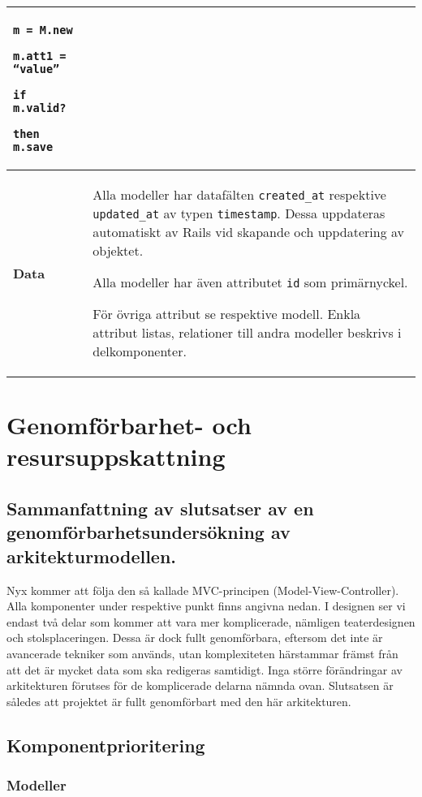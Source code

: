 \documentclass[a4paper, twoside, 11pt, titlepage]{article}
\begin{document}
\begin {table} [ht]
\begin{tabular} {  p{3.5cm} p{11.6cm} }
{{\tt m = M.new}

{\tt m.att1 = ``value''}

{\tt if m.valid?}

{\tt then m.save}} \\
				\hline
				{\sffamily\textbf{Data}} & {Alla modeller har datafälten {\tt created\_at} respektive {\tt updated\_at} av typen {\tt timestamp}. Dessa uppdateras automatiskt av Rails vid skapande och uppdatering av objektet.

Alla modeller har även attributet {\tt id} som primärnyckel.

För övriga attribut se respektive modell. Enkla attribut listas, relationer till andra modeller beskrivs i delkomponenter.} \\
				\hline
			\end{tabular} \end{table} \FloatBarrier


\clearpage
\section{Genomförbarhet- och resursuppskattning}



	\subsection{Sammanfattning av slutsatser av en genomförbarhetsundersökning av arkitekturmodellen.}


	Nyx kommer att följa den så kallade MVC-principen (Model-View-Controller). Alla komponenter under respektive punkt finns angivna nedan. I designen ser vi endast två delar som kommer att vara mer komplicerade, nämligen teaterdesignen och stolsplaceringen. Dessa är dock fullt genomförbara, eftersom det inte är avancerade tekniker som används, utan komplexiteten härstammar främst från att det är mycket data som ska redigeras samtidigt. Inga större förändringar av arkitekturen förutses för de komplicerade delarna nämnda ovan. Slutsatsen är således att projektet är fullt genomförbart med den här arkitekturen.

	\subsection{Komponentprioritering}



		\subsubsection{Modeller}
\end{document}
